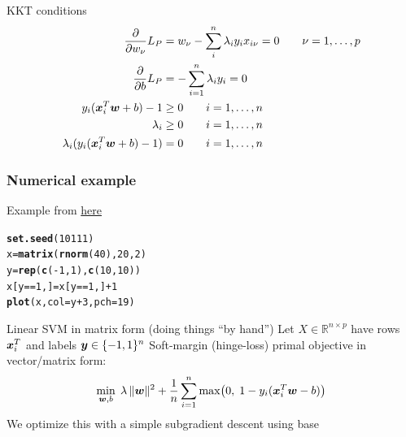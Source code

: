 \documentclass[aspectratio=169]{beamer}\usepackage[]{graphicx}\usepackage[]{xcolor}
\makeatletter
\newcommand{\hlnum}[1]{\textcolor[rgb]{0.686,0.059,0.569}{#1}}%
\newcommand{\hlopt}[1]{\textcolor[rgb]{0,0,0}{#1}}%
\newcommand{\hldef}[1]{\textcolor[rgb]{0.345,0.345,0.345}{#1}}%
\newcommand{\hlkwb}[1]{\textcolor[rgb]{0.69,0.353,0.396}{#1}}%
\newcommand{\hlkwc}[1]{\textcolor[rgb]{0.333,0.667,0.333}{#1}}%
\newcommand{\hlkwd}[1]{\textcolor[rgb]{0.737,0.353,0.396}{\textbf{#1}}}%
\newenvironment{kframe}{%
 \def\at@end@of@kframe{}%
 \ifinner\ifhmode%
  \def\at@end@of@kframe{\end{minipage}}%
  \begin{minipage}{\columnwidth}%
 \fi\fi%
 \def\FrameCommand##1{\hskip\@totalleftmargin \hskip-\fboxsep
 \colorbox{shadecolor}{##1}\hskip-\fboxsep
     \hskip-\linewidth \hskip-\@totalleftmargin \hskip\columnwidth}%
 \MakeFramed {\advance\hsize-\width
   \@totalleftmargin\z@ \linewidth\hsize
   \@setminipage}}%
 {\par\unskip\endMakeFramed%
 \at@end@of@kframe}
\newenvironment{knitrout}{}{} %
\makeatother
\begin{document}
\begin{frame}{KKT conditions}
    \begin{align*}
        \frac{\partial}{\partial w_\nu}L_P &=
        w_\nu-\sum_{i}^n\lambda_iy_ix_{i\nu}=0
        \qquad\nu=1,\ldots,p \\
        \frac{\partial}{\partial b}L_P &=
        -\sum_{i=1}^n \lambda_iy_i = 0 \\
        y_i(\bm{x}_i^T\bm{w}+b)-1 &\geq 0\qquad i=1,\ldots,n \\
        \lambda_i &\geq 0\qquad i=1,\ldots,n \\
        \lambda_i(y_i(\bm{x}_i^T\bm{w}+b)-1) &=0\qquad i=1,\ldots,n \\
    \end{align*}
\end{frame}


\begin{frame}[fragile]\frametitle{Numerical example}
Example from \href{https://www.datacamp.com/tutorial/support-vector-machines-r}{here}
\vfill
\begin{knitrout}
\color{fgcolor}\begin{kframe}
\begin{alltt}
\hlkwd{set.seed}\hldef{(}\hlnum{10111}\hldef{)}
\hldef{x} \hlkwb{=} \hlkwd{matrix}\hldef{(}\hlkwd{rnorm}\hldef{(}\hlnum{40}\hldef{),} \hlnum{20}\hldef{,} \hlnum{2}\hldef{)}
\hldef{y} \hlkwb{=} \hlkwd{rep}\hldef{(}\hlkwd{c}\hldef{(}\hlopt{-}\hlnum{1}\hldef{,} \hlnum{1}\hldef{),} \hlkwd{c}\hldef{(}\hlnum{10}\hldef{,} \hlnum{10}\hldef{))}
\hldef{x[y} \hlopt{==} \hlnum{1}\hldef{,]} \hlkwb{=} \hldef{x[y} \hlopt{==} \hlnum{1}\hldef{,]} \hlopt{+} \hlnum{1}
\hlkwd{plot}\hldef{(x,} \hlkwc{col} \hldef{= y} \hlopt{+} \hlnum{3}\hldef{,} \hlkwc{pch} \hldef{=} \hlnum{19}\hldef{)}
\end{alltt}
\end{kframe}
\end{knitrout}
\end{frame}


\begin{frame}{Linear SVM in matrix form (doing things ``by hand'')}
        Let $X \in \mathbb{R}^{n\times p}$ have rows $\bm{x}_i^T$ and labels $\bm{y} \in \{-1,1\}^n$
        \vfill
        Soft-margin (hinge-loss) primal objective in vector/matrix form:
        \[
                \min_{\bm{w},b} \; \lambda\,\lVert\bm{w}\rVert^2 
                + \frac{1}{n}\sum_{i=1}^n \max\bigl(0,\; 1 - y_i(\bm{x}_i^T\bm{w} - b)\bigr)
        \]
        We optimize this with a simple subgradient descent using base 
\end{frame}
\end{document}
